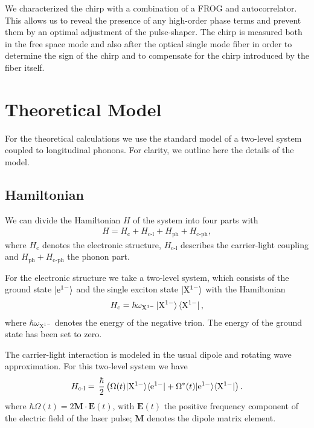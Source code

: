 \documentclass[aps,prl,reprint,superscriptaddress]{revtex4-1}
\begin{document}
We characterized the chirp with a combination of a FROG and autocorrelator. This allows us to reveal the presence of any high-order phase terms and prevent them by an optimal adjustment of the pulse-shaper. The chirp is measured both in the free space mode and also after the optical single mode fiber in order to determine the sign of the chirp and to compensate for the chirp introduced by the fiber itself.

\section{Theoretical Model}
For the theoretical calculations we use the standard model of a two-level system coupled to longitudinal phonons. For clarity, we outline here the details of the model.

\subsection{Hamiltonian}
We can divide the Hamiltonian $H$ of the system into four parts with
\begin{align*}
H = H_{\textrm{c}} + H_{\textrm{c-l}} + H_{\textrm{ph}} + H_{\textrm{c-ph}},
\end{align*}
where $H_{\textrm{c}}$ denotes the electronic structure, $H_{\textrm{c-l}}$ describes the carrier-light coupling and $H_{\textrm{ph}}+H_{\textrm{c-ph}} $ the phonon part. 

For the electronic structure we take a two-level system, which consists of the ground state $\ket{\mathrm{e}^{1-}}$ and the single exciton state $\ket{\mathrm{X}^{1-}}$ with the Hamiltonian
\begin{align*}
H_{\textrm{c}} = \hbar\omega_{\mathrm{X}^{1-}}\ket{\mathrm{X}^{1-}}\bra{\mathrm{X}^{1-}},
\end{align*}
where $\hbar\omega_{\mathrm{X}^{1-}}$ denotes the energy of the negative trion. The energy of the ground state has been set to zero.

The carrier-light interaction is modeled in the usual dipole and rotating wave approximation. For this two-level system we have
\begin{equation*}
H_{\textrm{c-l}} = \, \frac{\hbar}{2}\left(\Omega(t)|\mathrm{X}^{1-}\rangle\langle \mathrm{e}^{1-}| + \Omega^*(t)|\mathrm{e}^{1-}\rangle\langle \mathrm{X}^{1-}|\right). \\
\end{equation*}
where $\hbar\Omega(t)=2\mathbf{M}\cdot \mathbf{E}(t)$, with $\mathbf{E}(t)$ the positive frequency component of the electric field of the laser pulse; $\mathbf{M}$ denotes the dipole matrix element. 
\end{document}

